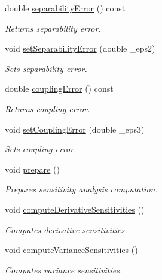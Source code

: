 \begin{DoxyCompactItemize}
double \hyperlink{class_go_s_u_m_1_1_c_sensitivity_analysis_a6612e7998dd41ac3b92f7fa0748ad847}{separability\-Error} () const 
\begin{DoxyCompactList}\small\item\em Returns separability error. \end{DoxyCompactList}\item 
void \hyperlink{class_go_s_u_m_1_1_c_sensitivity_analysis_a2a3031fbc415dd70ec49bb63bb61fd9e}{set\-Separability\-Error} (double \-\_\-eps2)
\begin{DoxyCompactList}\small\item\em Sets separability error. \end{DoxyCompactList}\item 
double \hyperlink{class_go_s_u_m_1_1_c_sensitivity_analysis_a66238241f0fcb39a773e75ca6715bbfd}{coupling\-Error} () const 
\begin{DoxyCompactList}\small\item\em Returns coupling error. \end{DoxyCompactList}\item 
void \hyperlink{class_go_s_u_m_1_1_c_sensitivity_analysis_a3122336f35b0863f8268fe3206652e67}{set\-Coupling\-Error} (double \-\_\-eps3)
\begin{DoxyCompactList}\small\item\em Sets coupling error. \end{DoxyCompactList}\item 
void \hyperlink{class_go_s_u_m_1_1_c_sensitivity_analysis_a0549bb9d579b671d48b7fb6488b6fe95}{prepare} ()
\begin{DoxyCompactList}\small\item\em Prepares sensitivity analysis computation. \end{DoxyCompactList}\item 
void \hyperlink{class_go_s_u_m_1_1_c_sensitivity_analysis_ae0e6ea7068b1e7e327193384260c9803}{compute\-Derivative\-Sensitivities} ()
\begin{DoxyCompactList}\small\item\em Computes derivative sensitivities. \end{DoxyCompactList}\item 
void \hyperlink{class_go_s_u_m_1_1_c_sensitivity_analysis_a058e59084f2ad2c5647318b2a62c5b40}{compute\-Variance\-Sensitivities} ()
\begin{DoxyCompactList}\small\item\em Computes variance sensitivities. \end{DoxyCompactList}\item 

\end{DoxyCompactItemize}
